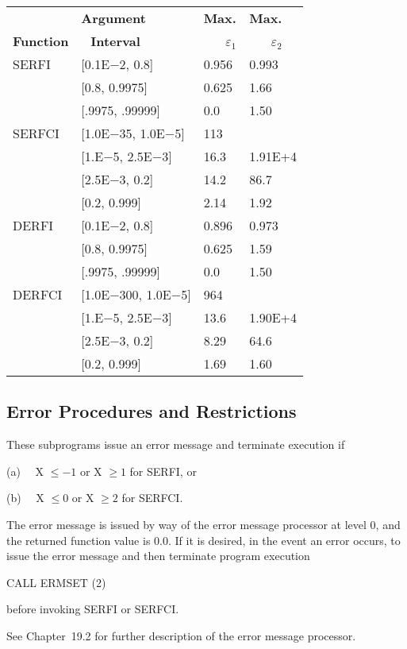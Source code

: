 \documentclass[twoside]{MATH77}
\begin{document}
\begin{tabular}{llll}
 & \bf Argument & \bf Max. & \bf Max.\\
\bf Function & \bf \ \,Interval & \bf \ \ \ $\varepsilon _1$ &
\bf \ \ \ $\varepsilon _2$\\
SERFI & [0.1E$-$2, 0.8] & 0.956 & 0.993\\
 & [0.8, 0.9975] & 0.625 & 1.66\\
 & [.9975, .99999] & 0.0 & 1.50\\
SERFCI & [1.0E$-$35, 1.0E$-$5] & 113\\
 & [1.E$-$5, 2.5E$-$3] & 16.3 & 1.91E+4\\
 & [2.5E$-$3, 0.2] & 14.2 & 86.7\\
 & [0.2, 0.999] & 2.14 & 1.92\\
DERFI & [0.1E$-$2, 0.8] & 0.896 & 0.973\\
 &[0.8, 0.9975] & 0.625 & 1.59\\
 &[.9975, .99999] & 0.0 & 1.50\\
DERFCI & [1.0E$-$300, 1.0E$-$5] & 964\\
 & [1.E$-$5, 2.5E$-$3] & 13.6 & 1.90E+4\\
 &[2.5E$-$3, 0.2] & 8.29 & 64.6\\
 &[0.2, 0.999] & 1.69 & 1.60
\end{tabular}




\subsection{Error Procedures and Restrictions}

These subprograms issue an error message and terminate execution if

\hspace{.4in}(a) \ \ X $\leq -1$ or X $\geq 1$ for SERFI, or

\hspace{.4in}(b) \ \ X $\leq 0$ or X $\geq 2$ for SERFCI.

The error message is issued by way of the error message processor at level 0,
and the returned function value is 0.0.  If it is desired, in the event an error
occurs, to issue the error message and then terminate program execution

\hspace{.4in}CALL ERMSET (2)

before invoking SERFI or SERFCI.

See Chapter~19.2 for further description of the error message processor.
\end{document}
